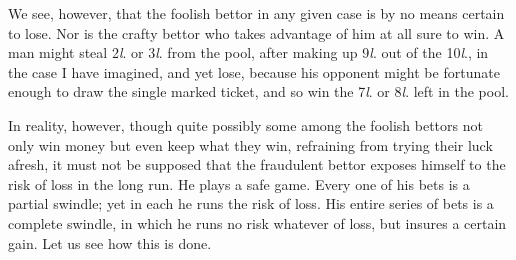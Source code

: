\documentclass[letterpaper,12pt,oneside,openany]{memoir}
\begin{document}
We see, however, that the foolish bettor in any
given case is by no means certain to lose. Nor is
the crafty bettor who takes advantage of him at all
sure to win. A man might steal 2\textit{l}. or 3\textit{l}. from the
pool, after making up 9\textit{l}. out of the 10\textit{l}., in the
case I have imagined, and yet lose, because his opponent
might be fortunate enough to draw the single
marked ticket, and so win the 7\textit{l}. or 8\textit{l}. left in the
pool.

In reality, however, though quite possibly some
among the foolish bettors not only win money but
even keep what they win, refraining from trying their
luck afresh, it must not be supposed that the fraudulent
bettor exposes himself to the risk of loss in the long
run. He plays a safe game. Every one of his bets is
a partial swindle; yet in each he runs the risk of loss.
His entire series of bets is a complete swindle, in which
he runs no risk whatever of loss, but insures a certain
gain. Let us see how this is done.
\end{document}
